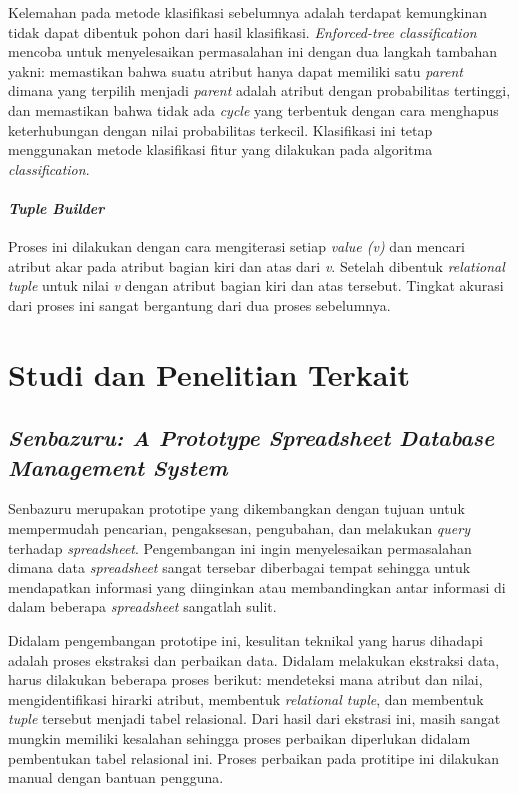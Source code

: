         Kelemahan pada metode klasifikasi sebelumnya adalah terdapat kemungkinan tidak dapat dibentuk pohon dari hasil klasifikasi. \textit{Enforced-tree classification} mencoba untuk menyelesaikan permasalahan ini dengan dua langkah tambahan yakni: memastikan bahwa suatu atribut hanya dapat memiliki satu \textit{parent} dimana yang terpilih menjadi \textit{parent} adalah atribut dengan probabilitas tertinggi, dan memastikan bahwa tidak ada \textit{cycle} yang terbentuk dengan cara menghapus keterhubungan dengan nilai probabilitas terkecil. Klasifikasi ini tetap menggunakan metode klasifikasi fitur yang dilakukan pada algoritma \textit{classification}.

        \paragraph{\textit{Tuple Builder}}
        Proses ini dilakukan dengan cara mengiterasi setiap \textit{value (v)} dan mencari atribut akar pada atribut bagian kiri dan atas dari \textit{v}. Setelah dibentuk \textit{relational tuple} untuk nilai \textit{v} dengan atribut bagian kiri dan atas tersebut. Tingkat akurasi dari proses ini sangat bergantung dari dua proses sebelumnya.


\section{Studi dan Penelitian Terkait}
    \subsection{\textit{Senbazuru: A Prototype Spreadsheet Database Management System}}
    Senbazuru \citep{Chen2013-2} merupakan prototipe yang dikembangkan dengan tujuan untuk mempermudah pencarian, pengaksesan, pengubahan, dan melakukan \textit{query} terhadap \textit{spreadsheet}. Pengembangan ini ingin menyelesaikan permasalahan dimana data \textit{spreadsheet} sangat tersebar diberbagai tempat sehingga untuk mendapatkan informasi yang diinginkan atau membandingkan antar informasi di dalam beberapa \textit{spreadsheet} sangatlah sulit. 

    Didalam pengembangan prototipe ini, kesulitan teknikal yang harus dihadapi adalah proses ekstraksi dan perbaikan data. Didalam melakukan ekstraksi data, harus dilakukan beberapa proses berikut: mendeteksi mana atribut dan nilai, mengidentifikasi hirarki atribut, membentuk \textit{relational tuple}, dan membentuk \textit{tuple} tersebut menjadi tabel relasional. Dari hasil dari ekstrasi ini, masih sangat mungkin memiliki kesalahan sehingga proses perbaikan diperlukan didalam pembentukan tabel relasional ini. Proses perbaikan pada protitipe ini dilakukan manual dengan bantuan pengguna.

